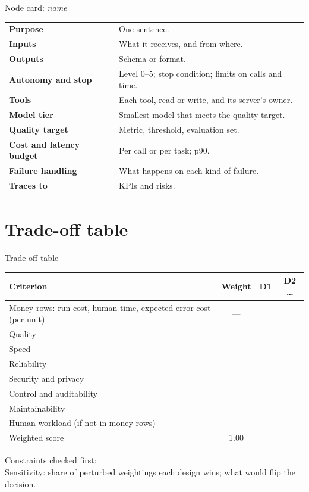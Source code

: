 \begin{template}{Node card: \emph{name}}
\begin{tabularx}{\linewidth}{@{}>{\bfseries}p{3.4cm}X@{}}
Purpose & One sentence. \\
Inputs & What it receives, and from where. \\
Outputs & Schema or format. \\
Autonomy and stop & Level 0--5; stop condition; limits on calls and time. \\
Tools & Each tool, read or write, and its server's owner. \\
Model tier & Smallest model that meets the quality target. \\
Quality target & Metric, threshold, evaluation set. \\
Cost and latency budget & Per call or per task; p90. \\
Failure handling & What happens on each kind of failure. \\
Traces to & KPIs and risks. \\
\end{tabularx}
\end{template}

\section{Trade-off table}

\begin{template}{Trade-off table}
\begin{tabular}{@{}lccc@{}}
Criterion & Weight & D1 & D2 \ldots \\
\hline
Money rows: run cost, human time, expected error cost (per unit) & --- & & \\
Quality & & & \\
Speed & & & \\
Reliability & & & \\
Security and privacy & & & \\
Control and auditability & & & \\
Maintainability & & & \\
Human workload (if not in money rows) & & & \\
\hline
Weighted score & 1.00 & & \\
\end{tabular}

\smallskip
Constraints checked first: \underline{\hspace{8cm}}\\
Sensitivity: share of perturbed weightings each design wins; what would flip the decision.
\end{template}


